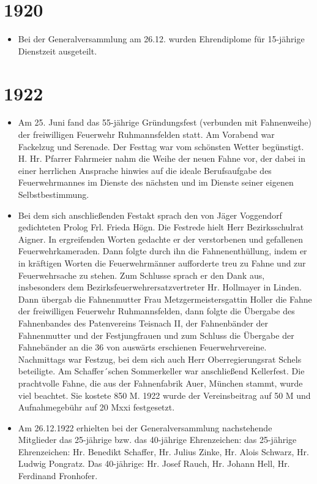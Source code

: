 \documentclass[12pt,a4paper]{book}
\begin{document}
\section*{1920}

\begin{itemize}
\item Bei der Generalversammlung am 26.12. wurden Ehrendiplome für 15-jährige
Dienstzeit ausgeteilt.
\end{itemize}

\section*{1922}

\begin{itemize}
\item Am 25. Juni fand das 55-jährige Gründungsfest (verbunden mit Fahnenweihe)
der freiwilligen Feuerwehr Ruhmannsfelden statt. Am Vorabend war Fackelzug und
Serenade. Der Festtag war vom schönsten Wetter begünstigt. H. Hr. Pfarrer
Fahrmeier nahm die Weihe der neuen Fahne vor, der dabei in einer herrlichen
Ansprache hinwies auf die ideale Berufsaufgabe des Feuerwehrmannes im Dienste
des nächsten und im Dienste seiner eigenen Selbstbestimmung.

\item Bei dem sich anschließenden Festakt sprach den von Jäger Voggendorf
gedichteten Prolog Frl. Frieda Högn. Die Festrede hielt Herr Bezirksschulrat
Aigner. In ergreifenden Worten gedachte er der verstorbenen und gefallenen
Feuerwehrkameraden. Dann folgte durch ihn die Fahnenenthüllung, indem er in
kräftigen Worten die Feuerwehrmänner aufforderte treu zu Fahne und zur
Feuerwehrsache zu stehen. Zum Schlusse sprach er den Dank aus, insbesonders dem
Bezirksfeuerwehrersatzvertreter Hr. Hollmayer in Linden. Dann übergab die
Fahnenmutter Frau Metzgermeistersgattin Holler die Fahne der freiwilligen
Feuerwehr Ruhmannsfelden, dann folgte die Übergabe des Fahnenbandes des
Patenvereins Teisnach II, der Fahnenbänder der Fahnenmutter und der
Festjungfrauen und zum Schluss die Übergabe der Fahnebänder an die 36 von
auswärts erschienen Feuerwehrvereine. Nachmittags war Festzug, bei dem sich auch
Herr Oberregierungsrat Schels beteiligte. Am Schaffer´schen Sommerkeller war
anschließend Kellerfest. Die prachtvolle Fahne, die aus der Fahnenfabrik Auer,
München stammt, wurde viel beachtet. Sie kostete 850 M. 1922 wurde der
Vereinsbeitrag auf 50 M und Aufnahmegebühr auf 20 Mxxi festgesetzt.

\item Am 26.12.1922 erhielten bei der Generalversammlung nachstehende Mitglieder
das 25-jährige bzw. das 40-jährige Ehrenzeichen: das 25-jährige Ehrenzeichen:
Hr. Benedikt Schaffer, Hr. Julius Zinke, Hr. Alois Schwarz, Hr. Ludwig Pongratz.
Das 40-jährige: Hr. Josef Rauch, Hr. Johann Hell, Hr. Ferdinand Fronhofer.
\end{itemize}
\end{document}
